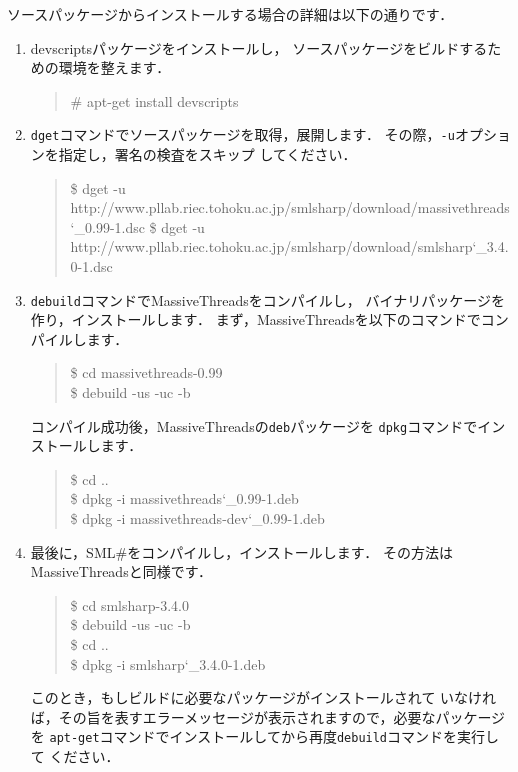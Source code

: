 \documentclass{jbook}
\newcommand{\smlsharp}{SML\#}
\newcommand{\version}{3.4.0}
\newenvironment{program}{\begin{quote}\begin{tt}}%
                        {\end{tt}\end{quote}}
\begin{document}
	ソースパッケージからインストールする場合の詳細は以下の通りです．
\begin{enumerate}
\item
	devscriptsパッケージをインストールし，
ソースパッケージをビルドするための環境を整えます．
\begin{program}
\# apt-get install devscripts
\end{program}
\item
	{\tt dget}コマンドでソースパッケージを取得，展開します．
	その際，{\tt -u}オプションを指定し，署名の検査をスキップ
してください．
\begin{program}
\$ dget -u http://www.pllab.riec.tohoku.ac.jp/smlsharp/download/massivethreads\char`\_0.99-1.dsc
\$ dget -u http://www.pllab.riec.tohoku.ac.jp/smlsharp/download/smlsharp\char`\_\version-1.dsc
\end{program}
\item
	{\tt debuild}コマンドでMassiveThreadsをコンパイルし，
バイナリパッケージを作り，インストールします．
	まず，MassiveThreadsを以下のコマンドでコンパイルします．
\begin{program}
\$ cd massivethreads-0.99\\
\$ debuild -us -uc -b
\end{program}
	コンパイル成功後，MassiveThreadsの{\tt deb}パッケージを
{\tt dpkg}コマンドでインストールします．
\begin{program}
\$ cd ..\\
\$ dpkg -i massivethreads\char`\_0.99-1.deb\\
\$ dpkg -i massivethreads-dev\char`\_0.99-1.deb
\end{program}

\item
	最後に，\smlsharp{}をコンパイルし，インストールします．
        その方法はMassiveThreadsと同様です．
\begin{program}
\$ cd smlsharp-\version\\
\$ debuild -us -uc -b\\
\$ cd ..\\
\$ dpkg -i smlsharp\char`\_\version-1.deb
\end{program}
	このとき，もしビルドに必要なパッケージがインストールされて
いなければ，その旨を表すエラーメッセージが表示されますので，必要なパッケージを
{\tt apt-get}コマンドでインストールしてから再度{\tt debuild}コマンドを実行して
ください．

\begin{program}
\end{program}
\end{enumerate}
\end{document}
